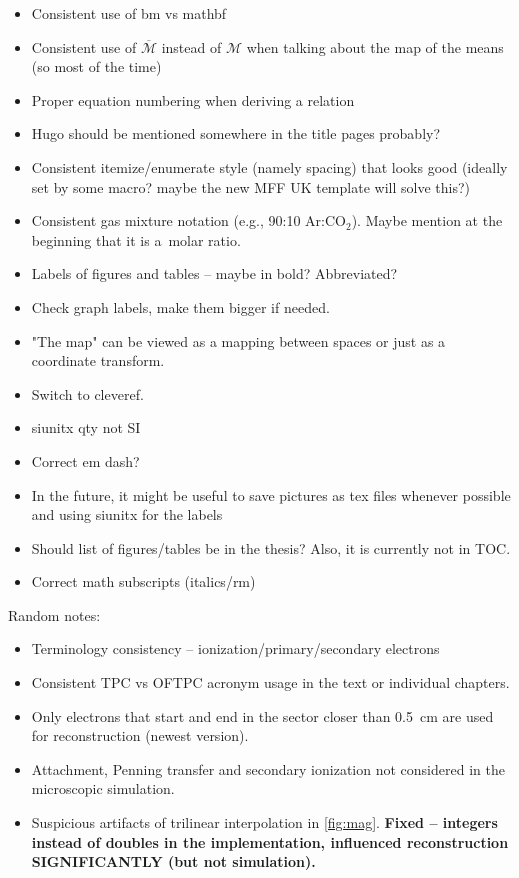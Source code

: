 {\begin{itemize}[topsep=4pt,itemsep=2pt]
				\item Consistent use of bm vs mathbf
				\item Consistent use of $\overbar{\mathcal{M}}$ instead of $\mathcal{M}$ when talking about the map of the means (so most of the time)
				\item Proper equation numbering when deriving a relation
				\item Hugo should be mentioned somewhere in the title pages probably?
				\item Consistent itemize/enumerate style (namely spacing) that looks good (ideally set by some macro? maybe the new MFF UK template will solve this?)
				\item Consistent gas mixture notation (e.g., 90:10 Ar:CO$_2$). Maybe mention at the beginning that it is a~molar ratio.
				\item Labels of figures and tables -- maybe in bold? Abbreviated?
				\item Check graph labels, make them bigger if needed.
				\item "The map" can be viewed as a mapping between spaces or just as a coordinate transform.
				\item Switch to cleveref.
				\item siunitx qty not SI
				\item Correct em dash?
				\item In the future, it might be useful to save pictures as tex files whenever possible and using siunitx for the labels
				\item Should list of figures/tables be in the thesis? Also, it is currently not in TOC.
				\item Correct math subscripts (italics/rm)
			\end{itemize}
			Random notes:
			\begin{itemize}[topsep=4pt,itemsep=2pt]
				\item Terminology consistency -- ionization/primary/secondary electrons
				\item Consistent \ac{TPC} vs \ac{OFTPC} acronym usage in the text or individual chapters.
				\item Only electrons that start and end in the sector closer than 0.5~cm are used for reconstruction (newest version).
				\item Attachment, Penning transfer and secondary ionization not considered in the microscopic simulation.
				\item Suspicious artifacts of trilinear interpolation in \cref{fig:mag}. \textbf{Fixed -- integers instead of doubles in the implementation, influenced reconstruction SIGNIFICANTLY (but not simulation).}

\end{itemize}}
